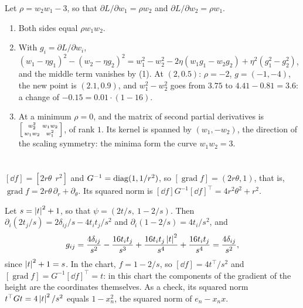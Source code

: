 Let $\rho = w_2w_1 - 3$, so that $\partial L/\partial w_1 = \rho w_2$ and
$\partial L/\partial w_2 = \rho w_1$.
\begin{enumerate}[nosep]
  \item Both sides equal $\rho w_1w_2$.
  \item With $g_i = \partial L/\partial w_i$,
        $(w_1 - \eta g_1)^2 - (w_2 - \eta g_2)^2
        = w_1^2 - w_2^2 - 2\eta(w_1g_1 - w_2g_2)
        + \eta^2(g_1^2 - g_2^2)$, and the middle term vanishes by (1).
        At $(2, 0.5)$: $\rho = -2$, $g = (-1, -4)$, the new point is
        $(2.1, 0.9)$, and $w_1^2 - w_2^2$ goes from $3.75$ to
        $4.41 - 0.81 = 3.6$: a change of
        $-0.15 = 0.01\cdot(1 - 16)$.
  \item At a minimum $\rho = 0$, and the matrix of second partial
        derivatives is
        $\begin{bsmallmatrix}w_2^2 & w_1w_2\\
        w_1w_2 & w_1^2\end{bsmallmatrix}$, of rank $1$. Its kernel is
        spanned by $(w_1, -w_2)$, the direction of the scaling symmetry:
        the minima form the curve $w_1w_2 = 3$.
\end{enumerate}

\section{}

$[\dd f] = [2r\theta\ \ r^2]$ and $G^{-1} = \operatorname{diag}(1, 1/r^2)$, so
$[\operatorname{grad}f] = (2r\theta, 1)$, that is,
$\operatorname{grad}f = 2r\theta\,\partial_r + \partial_\theta$. Its
squared norm is $[\dd f]G^{-1}[\dd f]^\top = 4r^2\theta^2 + r^2$.

Let $s = \left|t\right|^2 + 1$, so that $\psi = (2t/s,\ 1 - 2/s)$. Then
$\partial_i(2t_j/s) = 2\delta_{ij}/s - 4t_it_j/s^2$ and
$\partial_i(1 - 2/s) = 4t_i/s^2$, and
\[
  g_{ij} = \frac{4\delta_{ij}}{s^2} - \frac{16t_it_j}{s^3}
  + \frac{16t_it_j\left|t\right|^2}{s^4} + \frac{16t_it_j}{s^4}
  = \frac{4\delta_{ij}}{s^2} ,
\]
since $\left|t\right|^2 + 1 = s$. In the chart, $f = 1 - 2/s$, so
$[\dd f] = 4t^\top/s^2$ and
$[\operatorname{grad}f] = G^{-1}[\dd f]^\top = t$: in this chart the
components of the gradient of the height are the coordinates themselves.
As a check, its squared norm $t^\top Gt = 4\left|t\right|^2/s^2$ equals
$1 - x_n^2$, the squared norm of $e_n - x_nx$.

